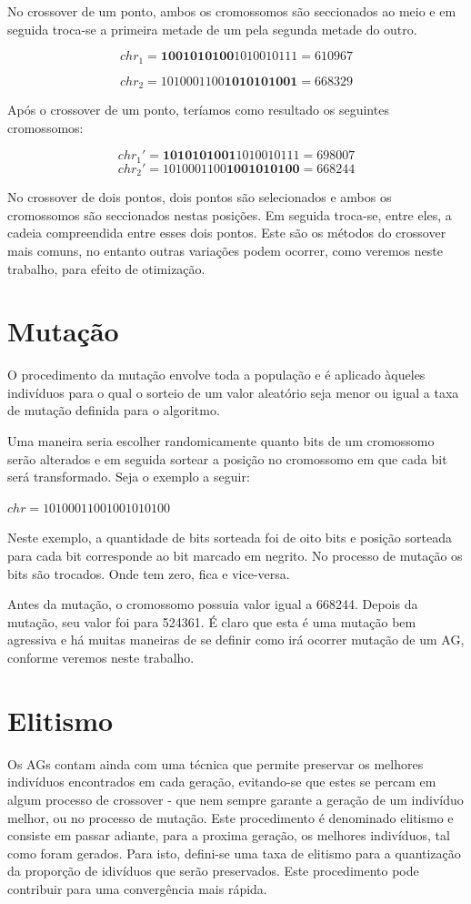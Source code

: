 \documentclass[
    12pt,               %
    oneside,%
    a4paper,            %
    english,            %
    french,             %
    spanish,            %
    brazil,             %
    ]{abntex2}
\begin{document}
  No crossover de um ponto, ambos os cromossomos são seccionados ao meio e em seguida troca-se a primeira metade de um pela segunda metade do outro. 

  $$chr_1 = \textbf{1001010100}1010010111 = 610967$$
  
  $$chr_2 = 1010001100\textbf{1010101001} = 668329$$

  Após o crossover de um ponto, teríamos como resultado os seguintes cromossomos:

  $$chr_1' = \textbf{1010101001}1010010111 = 698007$$
  $$chr_2' = 1010001100\textbf{1001010100} = 668244$$

  No crossover de dois pontos, dois pontos são selecionados e ambos os cromossomos são seccionados nestas posições. Em seguida troca-se, entre eles, a cadeia compreendida entre esses dois pontos. Este são os métodos do crossover mais comuns, no entanto outras variações podem ocorrer, como veremos neste trabalho, para efeito de otimização.

\section{Mutação}

  O procedimento da mutação envolve toda a população  e é aplicado àqueles indivíduos para o qual o sorteio de um valor aleatório seja menor ou igual a taxa de mutação definida para o algoritmo.

  Uma maneira seria escolher randomicamente quanto bits de um cromossomo serão alterados e em seguida sortear a posição no cromossomo em que cada bit será transformado. Seja o exemplo a seguir:

  $chr = 10100011001001010100$

  Neste exemplo, a quantidade de bits sorteada foi de oito bits e posição sorteada para cada bit corresponde ao bit marcado em negrito. No processo de mutação os bits são trocados. Onde tem zero, fica e vice-versa.

  Antes da mutação, o cromossomo possuia valor igual a 668244. Depois da mutação, seu valor foi para 524361. É claro que esta é uma mutação bem agressiva e há muitas maneiras de se definir como irá ocorrer mutação de um AG, conforme veremos neste trabalho.

\section{Elitismo}

  Os AGs contam ainda com uma técnica que permite preservar os melhores indivíduos encontrados em cada geração, evitando-se que estes se percam em algum processo de crossover - que nem sempre garante a geração de um indivíduo melhor, ou no processo de mutação. Este procedimento é denominado elitismo e consiste em passar adiante, para a proxima geração, os melhores indivíduos, tal como foram gerados. Para isto, defini-se uma taxa de elitismo para a quantização da proporção de idivíduos que serão preservados. Este procedimento pode contribuir para uma convergência mais rápida.
\end{document}
